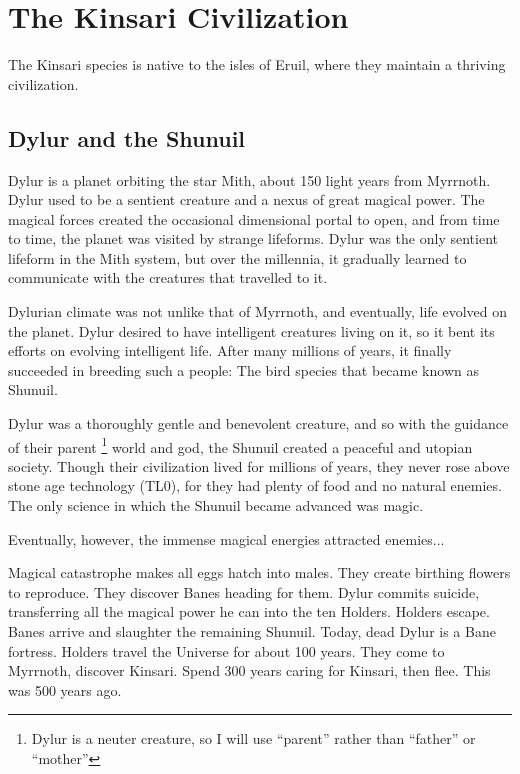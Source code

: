 \chapter{The Kinsari Civilization}

The Kinsari species is native to the isles of Eruil, where they maintain a thriving civilization.

\section{Dylur and the Shunuil}

Dylur is a planet orbiting the star Mith, about 150 light years from Myrrnoth. Dylur used to be a sentient creature and a nexus of great magical power. The magical forces created the occasional dimensional portal to open, and from time to time, the planet was visited by strange lifeforms. Dylur was the only sentient lifeform in the Mith system, but over the millennia, it gradually learned to communicate with the creatures that travelled to it.

Dylurian climate was not unlike that of Myrrnoth, and eventually, life evolved on the planet. Dylur desired to have intelligent creatures living on it, so it bent its efforts on evolving intelligent life. After many millions of years, it finally succeeded in breeding such a people: The bird species that became known as Shunuil. 

Dylur was a thoroughly gentle and benevolent creature, and so with the guidance of their parent \footnote{Dylur is a neuter creature, so I will use "`parent"' rather than "`father"' or "`mother"'} world and god, the Shunuil created a peaceful and utopian society. Though their civilization lived for millions of years, they never rose above stone age technology (TL0), for they had plenty of food and no natural enemies. The only science in which the Shunuil became advanced was magic. 

Eventually, however, the immense magical energies attracted enemies...

Magical catastrophe makes all eggs hatch into males. 
They create birthing flowers to reproduce. 
They discover Banes heading for them. 
Dylur commits suicide, transferring all the magical power he can into the ten Holders. 
Holders escape. 
Banes arrive and slaughter the remaining Shunuil. 
Today, dead Dylur is a Bane fortress. 
Holders travel the Universe for about 100 years.
They come to Myrrnoth, discover Kinsari. 
Spend 300 years caring for Kinsari, then flee. 
This was 500 years ago. 

